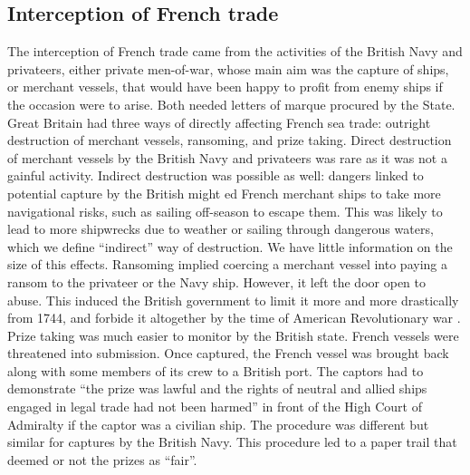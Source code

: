 \documentclass[12pt,a4paper,notitlepage,english]{article}
\begin{document}

\subsection{Interception of French trade}

The interception of French trade came from the activities of the British Navy and privateers, either private men-of-war, whose main aim was the capture of ships, or merchant vessels, that would have been happy to profit from enemy ships if the occasion were to arise.
Both needed letters of marque procured by the State.
Great Britain had three ways of directly affecting French sea trade: outright destruction of merchant vessels, ransoming, and prize taking.
Direct destruction of merchant vessels by the British Navy and privateers was rare as it was not a gainful activity.
Indirect destruction was possible as well: dangers linked to potential capture by the British might ed French merchant ships to take more navigational risks, such as sailing off-season to escape them.
This was likely to lead to more shipwrecks due to weather or sailing through dangerous waters, which we define ``indirect'' way of destruction.
We have little information on the size of this effects.
Ransoming implied coercing a merchant vessel into paying a ransom to the privateer or the Navy ship.
However, it left the door open to abuse.
This induced the British government to limit it more and more drastically from 1744, and forbide it altogether by the time of American Revolutionary war \cite[see][p. 734]{Hillmann2011}.
Prize taking was much easier to monitor by the British state.
French vessels were threatened into submission.
Once captured, the French vessel was brought back along with some members of its crew to a British port.
The captors had to demonstrate ``the prize was lawful and the rights of neutral and allied ships engaged in legal trade had not been harmed'' \cite[see][p. 734]{Hillmann2011} in front of the High Court of Admiralty if the captor was a civilian ship.
The procedure was different but similar for captures by the British Navy.
This procedure led to a paper trail that deemed or not the prizes as ``fair''.
\end{document}

